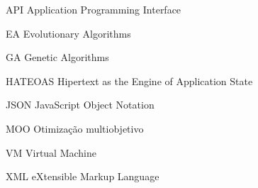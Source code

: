 \begin{siglas}
    \item[API] Application Programming Interface
    \item[EA] Evolutionary Algorithms
    \item[GA] Genetic Algorithms
    \item[HATEOAS] Hipertext as the Engine of Application State
    \item[JSON] JavaScript Object Notation
    \item[MOO] Otimização multiobjetivo
    \item[VM] Virtual Machine
    \item[XML] eXtensible Markup Language
\end{siglas}
